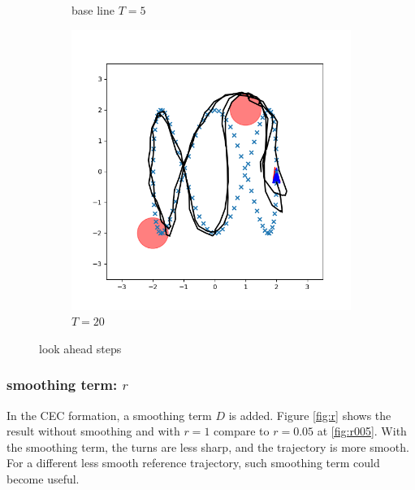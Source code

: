 \documentclass[conference]{IEEEtran}
\begin{document}
\begin{figure}[h]
\begin{subfigure}[b]{0.3\textwidth}
        \caption{base line $T=5$}
        \label{fig:T5}
    \end{subfigure}
    \hfill
    \begin{subfigure}[b]{0.3\textwidth}
        \includegraphics[width=\textwidth]{../fig/trajectory.cec.T_20_0.1.png}
        \caption{$T=20$}
        \label{fig:T20}
    \end{subfigure}
    \caption{look ahead steps}
    \label{fig:T}
\end{figure}

\subsubsection{smoothing term: $r$}
In the CEC formation, a smoothing term $D$ is added.
Figure \ref{fig:r} shows the result without smoothing and with $r=1$ compare to $r=0.05$ at \ref{fig:r005}.
With the smoothing term, the turns are less sharp, and the trajectory is more smooth.
For a different less smooth reference trajectory, such smoothing term could become useful.
\end{document}
